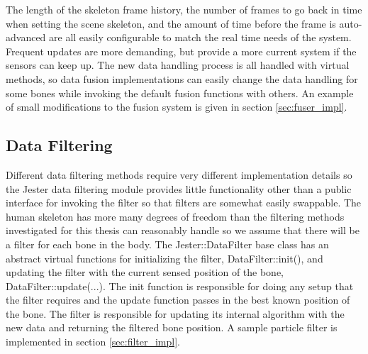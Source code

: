 The length of the skeleton frame history, the number of frames to go back in time when setting the scene skeleton, and the amount of time before the frame is auto-advanced are all easily configurable to match the real time needs of the system. Frequent updates are more demanding, but provide a more current system if the sensors can keep up. The new data handling process is all handled with virtual methods, so data fusion implementations can easily change the data handling for some bones while invoking the default fusion functions with others. An example of small modifications to the fusion system is given in section \ref{sec:fuser_impl}.
	
\subsection{Data Filtering}

Different data filtering methods require very different implementation details so the Jester data filtering module provides little functionality other than a public interface for invoking the filter so that filters are somewhat easily swappable. The human skeleton has more many degrees of freedom than the filtering methods investigated for this thesis can reasonably handle so we assume that there will be a filter for each bone in the body. The Jester::DataFilter base class has an abstract virtual functions for initializing the filter, DataFilter::init(), and updating the filter with the current sensed position of the bone, DataFilter::update(...). The init function is responsible for doing any setup that the filter requires and the update function passes in the best known position of the bone. The filter is responsible for updating its internal algorithm with the new data and returning the filtered bone position. A sample particle filter is implemented in section \ref{sec:filter_impl}.
